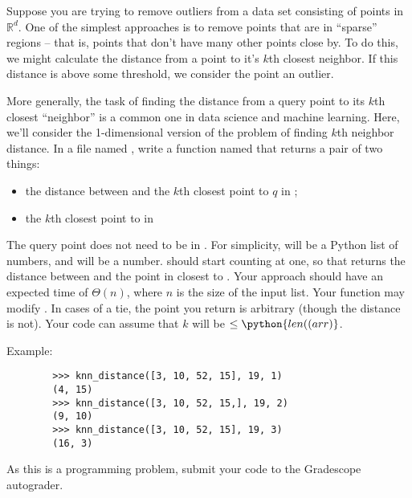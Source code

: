 \begin{progprob}
    Suppose you are trying to remove outliers from a data set consisting of
    points in $\mathbb R^d$. One of the simplest approaches is to remove points
    that are in ``sparse'' regions -- that is, points that don't have many
    other points close by. To do this, we might calculate the distance from a
    point to it's $k$th closest neighbor. If this distance is above some
    threshold, we consider the point an outlier.

    More generally, the task of finding the distance from a query point to its
    $k$th closest ``neighbor'' is a common one in data science and machine
    learning.
    Here, we'll consider the 1-dimensional version of the problem of
    finding $k$th neighbor distance. In a file named ,
    write a function named  that returns a
    pair of two things:

    \begin{itemize}
        \item the distance between  and the $k$th closest point to $q$
            in ;
        \item the $k$th closest point to  in 
    \end{itemize}

    The query point  does not need to be in
    . For simplicity,  will be a Python list of numbers,
    and  will be a number.  should start counting at one,
    so that  returns the distance between
     and the point in  closest to . Your
    approach should have an expected time of $\Theta(n)$, where $n$ is the
    size of the input list. Your function may modify . In cases
    of a tie, the point you return is arbitrary (though the distance is not).
    Your code can assume that $k$ will be $\leq \python{len((arr)}$.

    Example:
    \begin{verbatim}
        >>> knn_distance([3, 10, 52, 15], 19, 1)
        (4, 15)
        >>> knn_distance([3, 10, 52, 15,], 19, 2)
        (9, 10)
        >>> knn_distance([3, 10, 52, 15], 19, 3)
        (16, 3)
    \end{verbatim}

    As this is a programming problem, submit your code to the Gradescope
    autograder.

    \begin{soln}
    \end{soln}
\end{progprob}

